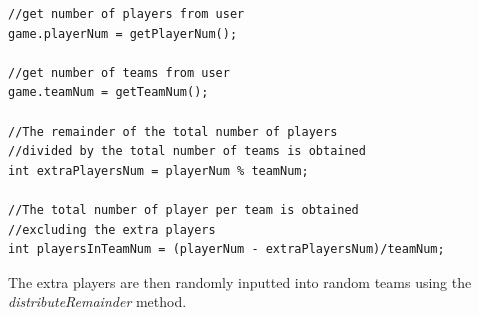 \documentclass[a4paper,12pt]{extarticle}
\begin{document}
\begin{lstlisting}
//get number of players from user
game.playerNum = getPlayerNum();

//get number of teams from user
game.teamNum = getTeamNum();

//The remainder of the total number of players 
//divided by the total number of teams is obtained
int extraPlayersNum = playerNum % teamNum;

//The total number of player per team is obtained 
//excluding the extra players
int playersInTeamNum = (playerNum - extraPlayersNum)/teamNum;
\end{lstlisting}
\vspace{4mm}

\newpage
\noindent The extra players are then randomly inputted into random teams using the \textit{distributeRemainder} method.
\end{document}
